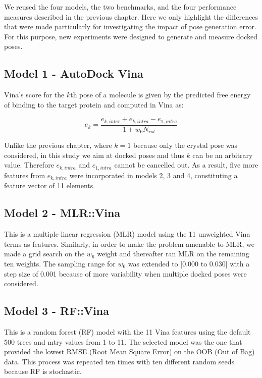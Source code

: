 We reused the four models, the two benchmarks, and the four performance measures described in the previous chapter. Here we only highlight the differences that were made particularly for investigating the impact of pose generation error. For this purpose, new experiments were designed to generate and measure docked poses.

\subsection{Model 1 - AutoDock Vina}

Vina's score for the $k$th pose of a molecule is given by the predicted free energy of binding to the target protein and computed in Vina as:

\begin{equation}
\label{rfscore4:e_k}
e_k=\frac{e_{k,inter}+e_{k,intra}-e_{1,intra}}{1+w_6N_{rot}}
\end{equation}

Unlike the previous chapter, where $k=1$ because only the crystal pose was considered, in this study we aim at docked poses and thus $k$ can be an arbitrary value. Therefore $e_{k,intra}$ and $e_{1,intra}$ cannot be cancelled out. As a result, five more features from $e_{k,intra}$ were incorporated in models 2, 3 and 4, constituting a feature vector of 11 elements.

\subsection{Model 2 - MLR::Vina}

This is a multiple linear regression (MLR) model using the 11 unweighted Vina terms as features. Similarly, in order to make the problem amenable to MLR, we made a grid search on the $w_6$ weight and thereafter ran MLR on the remaining ten weights. The sampling range for $w_6$ was extended to [0.000 to 0.030] with a step size of 0.001 because of more variability when multiple docked poses were considered.

\subsection{Model 3 - RF::Vina}

This is a random forest (RF) model with the 11 Vina features using the default 500 trees and mtry values from 1 to 11. The selected model was the one that provided the lowest RMSE (Root Mean Square Error) on the OOB (Out of Bag) data. This process was repeated ten times with ten different random seeds because RF is stochastic.

